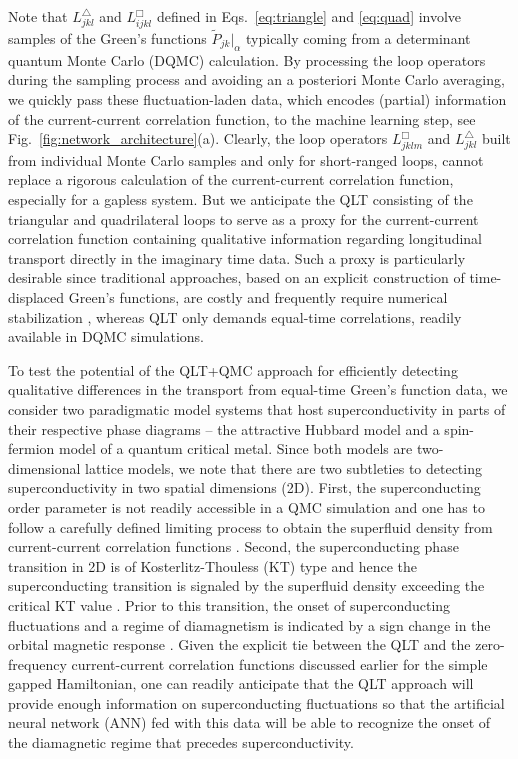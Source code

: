 \documentclass[amsmath,amssymb, aps, prx, longbibliography, twocolumn]{revtex4-1}
\begin{document}
Note that  $L^\triangle_{jkl}$ and  $L^\Box_{ijkl}$ defined in Eqs.~\eqref{eq:triangle} and \eqref{eq:quad} involve samples of the Green's functions $\widetilde{P}_{jk}|_{\alpha}$ typically coming from a determinant quantum Monte Carlo (DQMC) calculation. 
By processing the loop operators during the sampling process and avoiding an a posteriori Monte Carlo averaging, we quickly pass these fluctuation-laden data, which encodes (partial) information of the current-current correlation function, to the machine learning step, see Fig.~\ref{fig:network_architecture}(a). 
Clearly, the loop operators $L^\Box_{jklm}$ and $ L^\triangle_{jkl}$ built from individual Monte Carlo samples and only for short-ranged loops, cannot replace a rigorous calculation of the current-current correlation function, especially for a gapless system. But we anticipate the QLT consisting of the triangular and quadrilateral loops to serve as a proxy for the current-current correlation function containing qualitative information regarding longitudinal transport directly in the imaginary time data. Such a proxy is particularly desirable since traditional approaches,  based on an explicit construction of time-displaced Green's functions, are costly and frequently require numerical stabilization \cite{Hirsch1988, Santos2003}, whereas QLT only demands equal-time correlations, readily available in DQMC simulations.




%
To test the potential of the QLT+QMC approach for efficiently detecting qualitative differences in the transport from equal-time Green's function data, we consider two paradigmatic model systems that host superconductivity in parts of their respective phase diagrams -- the attractive Hubbard model and a spin-fermion model of a quantum critical metal.
Since both models are two-dimensional lattice models, we note that there are two subtleties to detecting superconductivity  in two spatial dimensions (2D). First, the superconducting order parameter is not readily accessible in a QMC simulation and one has to follow a carefully defined limiting process to obtain the superfluid density from current-current correlation functions \cite{Scalapino1993, Scalapino1992}. Second, the superconducting phase transition in 2D is of Kosterlitz-Thouless (KT) type and hence the superconducting transition is signaled by the superfluid density exceeding the  critical KT value \cite{KT1973}. Prior to this transition, the onset of superconducting fluctuations and a regime of diamagnetism is indicated by a sign change in the orbital magnetic response \cite{Schattner2016}. Given the explicit tie between the QLT and the zero-frequency current-current correlation functions discussed earlier for the simple gapped Hamiltonian, one can readily anticipate that the QLT approach will provide enough information on superconducting fluctuations so that the artificial neural network (ANN) fed with this data will be able to recognize the onset of the diamagnetic regime that precedes  superconductivity.  
\end{document}
